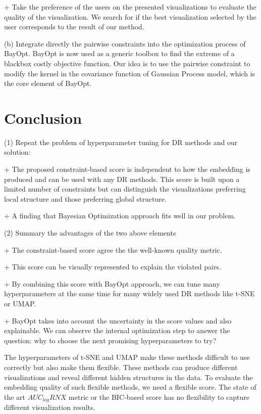 + Take the preference of the users on the presented visualizations to evaluate the quality of the visualization. We search for if the best visualization selected by the user corresponds to the result of our method.


(b) Integrate directly the pairwise constraints into the optimization process of BayOpt.
BayOpt is now used as a generic toolbox to find the extreme of a blackbox costly objective function.
Our idea is to use the pairwise constraint to modify the kernel in the covariance function of Gaussian Process model, which is the core element of BayOpt.


\section{Conclusion}

\par (1) Repeat the problem of hyperparameter tuning for DR methods and our solution:

+ The proposed constraint-based score is independent to how the embedding is produced and can be used with any DR methods.
This score is built upon a limited number of constraints but can distinguish the visualizations preferring local structure and those preferring global structure.

+ A finding that Bayesian Optimization approach fits well in our problem.


\vspace{8pt}
\par (2) Summary the advantages of the two above elements

+ The constraint-based score agree the the well-known quality metric.

+ This score can be visually represented to explain the violated pairs.

+ By combining this score with BayOpt approach, we can tune many hyperparameters at the same time for many widely used DR methods like t-SNE or UMAP.

+ BayOpt takes into account the uncertainty in the score values and also explainable. We can observe the internal optimization step to answer the question: why to choose the next promising hyperparameters to try?

The hyperparameters of t-SNE and UMAP make these methods difficult to use correctly but also make them flexible.
These methods can produce different visualizations and reveal different hidden structures in the data.
To evaluate the embedding quality of such flexible methods, we need a flexible score.
The state of the art $AUC_{log}RNX$ metric or the BIC-based score has no flexibility to capture different visualization results.